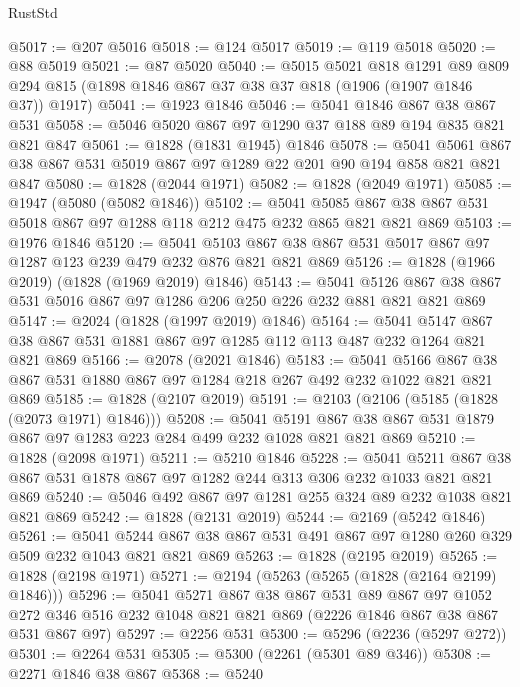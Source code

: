\begin{lexlean}{RustStd}
\begin{coremodule}
@5017 := @207 @5016
@5018 := @124 @5017
@5019 := @119 @5018
@5020 := @88 @5019
@5021 := @87 @5020
@5040 := @5015
    @5021
    @818
    @1291
    @89
    @809
    @294
    @815
    (@1898 @1846 @867 @37 @38 @37 @818 (@1906 (@1907 @1846 @37)) @1917)
@5041 := @1923 @1846
@5046 := @5041 @1846 @867 @38 @867 @531
@5058 := @5046 @5020 @867 @97 @1290 @37 @188 @89 @194 @835 @821 @821 @847
@5061 := @1828 (@1831 @1945) @1846
@5078 := @5041 @5061 @867 @38 @867 @531 @5019 @867 @97 @1289 @22 @201 @90 @194 @858 @821 @821 @847
@5080 := @1828 (@2044 @1971)
@5082 := @1828 (@2049 @1971)
@5085 := @1947 (@5080 (@5082 @1846))
@5102 := @5041 @5085 @867 @38 @867 @531 @5018 @867 @97 @1288 @118 @212 @475 @232 @865 @821 @821 @869
@5103 := @1976 @1846
@5120 := @5041 @5103 @867 @38 @867 @531 @5017 @867 @97 @1287 @123 @239 @479 @232 @876 @821 @821 @869
@5126 := @1828 (@1966 @2019) (@1828 (@1969 @2019) @1846)
@5143 := @5041 @5126 @867 @38 @867 @531 @5016 @867 @97 @1286 @206 @250 @226 @232 @881 @821 @821 @869
@5147 := @2024 (@1828 (@1997 @2019) @1846)
@5164 := @5041
    @5147
    @867
    @38
    @867
    @531
    @1881
    @867
    @97
    @1285
    @112
    @113
    @487
    @232
    @1264
    @821
    @821
    @869
@5166 := @2078 (@2021 @1846)
@5183 := @5041
    @5166
    @867
    @38
    @867
    @531
    @1880
    @867
    @97
    @1284
    @218
    @267
    @492
    @232
    @1022
    @821
    @821
    @869
@5185 := @1828 (@2107 @2019)
@5191 := @2103 (@2106 (@5185 (@1828 (@2073 @1971) @1846)))
@5208 := @5041
    @5191
    @867
    @38
    @867
    @531
    @1879
    @867
    @97
    @1283
    @223
    @284
    @499
    @232
    @1028
    @821
    @821
    @869
@5210 := @1828 (@2098 @1971)
@5211 := @5210 @1846
@5228 := @5041
    @5211
    @867
    @38
    @867
    @531
    @1878
    @867
    @97
    @1282
    @244
    @313
    @306
    @232
    @1033
    @821
    @821
    @869
@5240 := @5046 @492 @867 @97 @1281 @255 @324 @89 @232 @1038 @821 @821 @869
@5242 := @1828 (@2131 @2019)
@5244 := @2169 (@5242 @1846)
@5261 := @5041 @5244 @867 @38 @867 @531 @491 @867 @97 @1280 @260 @329 @509 @232 @1043 @821 @821 @869
@5263 := @1828 (@2195 @2019)
@5265 := @1828 (@2198 @1971)
@5271 := @2194 (@5263 (@5265 (@1828 (@2164 @2199) @1846)))
@5296 := @5041
    @5271
    @867
    @38
    @867
    @531
    @89
    @867
    @97
    @1052
    @272
    @346
    @516
    @232
    @1048
    @821
    @821
    @869
    (@2226 @1846 @867 @38 @867 @531 @867 @97)
@5297 := @2256 @531
@5300 := @5296 (@2236 (@5297 @272))
@5301 := @2264 @531
@5305 := @5300 (@2261 (@5301 @89 @346))
@5308 := @2271 @1846 @38 @867
@5368 := @5240

\end{coremodule}
\end{lexlean}
